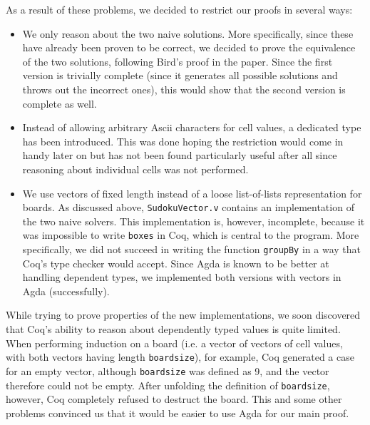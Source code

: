 \documentclass[a4paper,11pt]{article}
\begin{document}
As a result of these problems, we decided to restrict our proofs in several ways:
\begin{itemize}
  \item We only reason about the two naive solutions. More specifically, since these have already been proven to be correct, we decided to prove the equivalence of the two solutions, following Bird's proof in the paper. Since the first version is trivially complete (since it generates all possible solutions and throws out the incorrect ones), this would show that the second version is complete as well.
  \item Instead of allowing arbitrary Ascii characters for cell values, a dedicated type has been introduced. This was done hoping the restriction would come in handy later on but has not been found particularly useful after all since reasoning about individual cells was not performed.
  \item We use vectors of fixed length instead of a loose list-of-lists representation for boards. As discussed above, \texttt{SudokuVector.v} contains an implementation of the two naive solvers. This implementation is, however, incomplete, because it was impossible to write \texttt{boxes} in Coq, which is central to the program. More specifically, we did not succeed in writing the function \texttt{groupBy} in a way that Coq's type checker would accept. Since Agda is known to be better at handling dependent types, we implemented both versions with vectors in Agda (successfully). 
\end{itemize} 

While trying to prove properties of the new implementations, we soon discovered that Coq's ability to reason about dependently typed values is quite limited. When performing induction on a board (i.e. a vector of vectors of cell values, with both vectors having length \texttt{boardsize}), for example, Coq generated a case for an empty vector, although \texttt{boardsize} was defined as 9, and the vector therefore could not be empty. After unfolding the definition of \texttt{boardsize}, however, Coq completely refused to destruct the board. This and some other problems convinced us that it would be easier to use Agda for our main proof.
\end{document}
